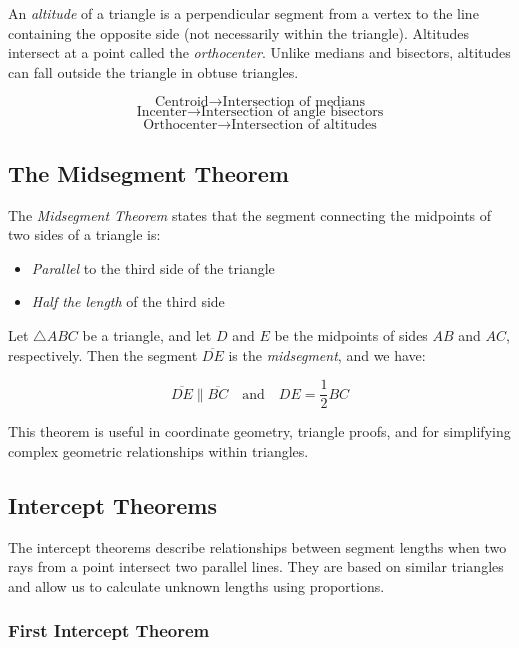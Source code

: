 An \emph{altitude} of a triangle is a perpendicular segment from a vertex to the line containing the 
opposite side (not necessarily within the triangle). Altitudes intersect at a point called the 
\emph{orthocenter}. Unlike medians and bisectors, altitudes can fall outside the triangle in obtuse 
triangles.

\[
	\text{Centroid} \rightarrow \text{Intersection of medians}\]
\[
	\text{Incenter} \rightarrow \text{Intersection of angle bisectors}\]
\[
	\text{Orthocenter} \rightarrow \text{Intersection of altitudes}
\]

\subsection{The Midsegment Theorem}

The \emph{Midsegment Theorem} states that the segment connecting the midpoints of two sides of a triangle 
is:

\begin{itemize}

	\item \emph{Parallel} to the third side of the triangle

	\item \emph{Half the length} of the third side

\end{itemize}

Let \( \triangle ABC \) be a triangle, and let \( D \) and \( E \) be the 
midpoints of sides \( AB \) and \( AC \), respectively. Then the segment \( \overline{DE} \) is 
the \emph{midsegment}, and we have:

\[
	\overline{DE} \parallel \overline{BC} \quad \text{and} \quad DE = \frac{1}{2} BC
\]

This theorem is useful in coordinate geometry, triangle proofs, 
and for simplifying complex geometric relationships within triangles.

\subsection{Intercept Theorems}

The intercept theorems describe relationships between segment lengths when two rays from a point intersect 
two parallel lines. They are based on similar triangles and allow us to calculate unknown lengths using 
proportions.

\subsubsection{First Intercept Theorem}

